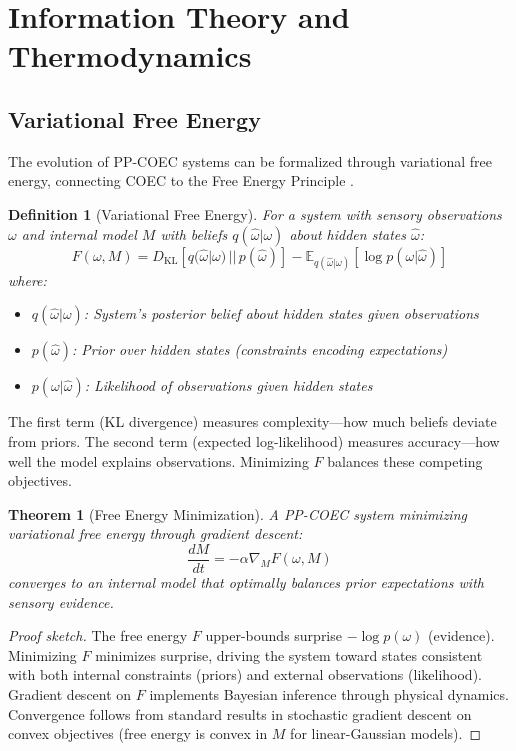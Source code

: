 \documentclass[11pt]{article}
\newtheorem{definition}{Definition}
\newtheorem{theorem}{Theorem}
\begin{document}
\section{Information Theory and Thermodynamics}
\label{sec:information}

\subsection{Variational Free Energy}

The evolution of PP-COEC systems can be formalized through variational free energy, connecting COEC to the Free Energy Principle \citep{friston2010free}.

\begin{definition}[Variational Free Energy]
For a system with sensory observations $\omega$ and internal model $M$ with beliefs $q(\hat{\omega}|\omega)$ about hidden states $\hat{\omega}$:
\begin{equation}
F(\omega, M) = D_{\text{KL}}[q(\hat{\omega}|\omega) \,||\, p(\hat{\omega})] - \mathbb{E}_{q(\hat{\omega}|\omega)}[\log p(\omega|\hat{\omega})]
\end{equation}
where:
\begin{itemize}
\item $q(\hat{\omega}|\omega)$: System's posterior belief about hidden states given observations
\item $p(\hat{\omega})$: Prior over hidden states (constraints encoding expectations)
\item $p(\omega|\hat{\omega})$: Likelihood of observations given hidden states
\end{itemize}
\end{definition}

The first term (KL divergence) measures complexity—how much beliefs deviate from priors. The second term (expected log-likelihood) measures accuracy—how well the model explains observations. Minimizing $F$ balances these competing objectives.

\begin{theorem}[Free Energy Minimization]
A PP-COEC system minimizing variational free energy through gradient descent:
\begin{equation}
\frac{dM}{dt} = -\alpha \nabla_M F(\omega, M)
\end{equation}
converges to an internal model that optimally balances prior expectations with sensory evidence.
\end{theorem}

\begin{proof}[Proof sketch]
The free energy $F$ upper-bounds surprise $-\log p(\omega)$ (evidence). Minimizing $F$ minimizes surprise, driving the system toward states consistent with both internal constraints (priors) and external observations (likelihood). Gradient descent on $F$ implements Bayesian inference through physical dynamics. Convergence follows from standard results in stochastic gradient descent on convex objectives (free energy is convex in $M$ for linear-Gaussian models).
\end{proof}
\end{document}
